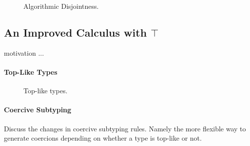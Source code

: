 \begin{figure}[h]


  \caption{Algorithmic Disjointness.}
  \label{fig:disjointness}
\end{figure}


\subsection{An Improved Calculus with $\top$}

motivation ...



\paragraph{Top-Like Types}

\begin{figure}[t]
  \caption{Top-like types.}
  \label{fig:fi-toplike}
\end{figure}




\paragraph{Coercive Subtyping} Discuss the changes in 
coercive subtyping rules. Namely the more flexible way to 
generate coercions depending on whether a type is top-like 
or not. 

